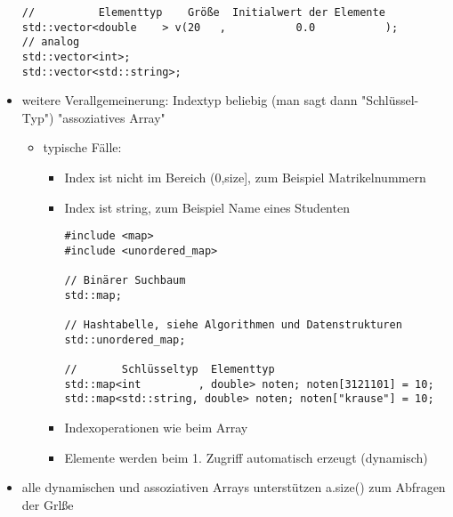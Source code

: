 \documentclass[a4paper]{scrartcl}
\begin{document}
\begin{itemize}
\begin{verbatim}
//          Elementtyp    Größe  Initialwert der Elemente
std::vector<double    > v(20   ,           0.0           );
// analog
std::vector<int>;
std::vector<std::string>;
\end{verbatim}
\item weitere Verallgemeinerung: Indextyp beliebig (man sagt dann "Schlüssel-Typ") "assoziatives Array"
\begin{itemize}
\item typische Fälle:
\begin{itemize}
\item Index ist nicht im Bereich (0,size], zum Beispiel Matrikelnummern
\item Index ist string, zum Beispiel Name eines Studenten
\begin{verbatim}
#include <map>
#include <unordered_map>

// Binärer Suchbaum
std::map;

// Hashtabelle, siehe Algorithmen und Datenstrukturen
std::unordered_map;

//       Schlüsseltyp  Elementtyp
std::map<int         , double> noten; noten[3121101] = 10;
std::map<std::string, double> noten; noten["krause"] = 10;
\end{verbatim}
\item Indexoperationen wie beim Array
\item Elemente werden beim 1. Zugriff automatisch erzeugt (dynamisch)
\end{itemize}
\end{itemize}
\item alle dynamischen und assoziativen Arrays unterstützen a.size() zum Abfragen der Grlße
\end{itemize}
\end{document}
